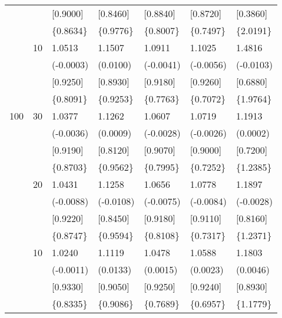 \begin{table}[H]
{\begin{tabular}{c c | C{2.48cm} | C{2.48cm} | C{2.48cm} | C{2.48cm} | C{2.48cm} }
			&&[0.9000]&[0.8460]&[0.8840]&[0.8720]&[0.3860]\\
			&&\{0.8634\}&\{0.9776\}&\{0.8007\}&\{0.7497\}&\{2.0191\}\\
			&10&1.0513&1.1507&1.0911&1.1025&1.4816\\
			&&(-0.0003)&(0.0100)&(-0.0041)&(-0.0056)&(-0.0103)\\
			&&[0.9250]&[0.8930]&[0.9180]&[0.9260]&[0.6880]\\
			&&\{0.8091\}&\{0.9253\}&\{0.7763\}&\{0.7072\}&\{1.9764\}\\
			\cmidrule(lr){1-7}
			100&30&1.0377&1.1262&1.0607&1.0719&1.1913\\
			&&(-0.0036)&(0.0009)&(-0.0028)&(-0.0026)&(0.0002)\\
			&&[0.9190]&[0.8120]&[0.9070]&[0.9000]&[0.7200]\\
			&&\{0.8703\}&\{0.9562\}&\{0.7995\}&\{0.7252\}&\{1.2385\}\\
			&20&1.0431&1.1258&1.0656&1.0778&1.1897\\
			&&(-0.0088)&(-0.0108)&(-0.0075)&(-0.0084)&(-0.0028)\\
			&&[0.9220]&[0.8450]&[0.9180]&[0.9110]&[0.8160]\\
			&&\{0.8747\}&\{0.9594\}&\{0.8108\}&\{0.7317\}&\{1.2371\}\\
			&10&1.0240&1.1119&1.0478&1.0588&1.1803\\
			&&(-0.0011)&(0.0133)&(0.0015)&(0.0023)&(0.0046)\\
			&&[0.9330]&[0.9050]&[0.9250]&[0.9240]&[0.8930]\\
			&&\{0.8335\}&\{0.9086\}&\{0.7689\}&\{0.6957\}&\{1.1779\}\\
			\bottomrule[1.5pt]
	\end{tabular}}
	\label{table:table S.5}
\end{table}


